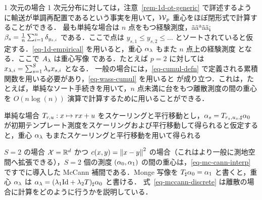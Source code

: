 \begin{rem1}{1 次元の場合}\label{rem-bary-1d}
	1 次元分布に対しては，注意~\ref{rem-1d-ot-generic} で詳述するように輸送が単調再配置であるという事実を用いて，$\operatorname{\mathcal{W}}_p$ 重心をほぼ閉形式で計算することができる．
	最も単純な場合は $n$ 点をもつ経験測度，ããªãã¡$\beta_s = \frac{1}{n}\sum_{i=1}^n \delta_{y_{s,i}}$ である．ここで点は $y_{s,1} \leq y_{s,2} \leq \ldots$ とソートされていると仮定する．\eqref{eq-1d-empirical} を用いると，重心 $\alpha_\lambda$ もまた $n$ 点上の経験測度
	となる．ここで $A_\lambda$ は重心写像
	である．たとえば $p=2$ に対しては $x_{\lambda,i} = \sum_{s=1}^S \lambda_s x_{s,i}$ となる．
	一般の場合には，\eqref{eq-cumul-defn} で定義される累積関数を用いる必要があり，\eqref{eq-wass-cumul} を用いると
	が成り立つ．これは，たとえば，単純なソート手続きを用いて，$n$ 点未満に台をもつ離散測度の間の重心を $O(n\log(n))$ 演算で計算するために用いることができる．
\end{rem1}



\begin{rem1}{単純な場合}
	$T_{r,u} : x \mapsto rx+u$ をスケーリングと平行移動とし，$\alpha_{s} = T_{r_s,u_s,\sharp} \alpha_0$ が初期テンプレート測度をスケーリングおよび平行移動して得られると仮定すると，重心 $\alpha_\lambda$ もまたスケーリングと平行移動を用いて得られる 
\end{rem1}


\begin{rem1}{$S=2$ の場合}
	$\mathcal{X}=\mathbb{R}^d$ かつ $c(x,y)=\left\| x-y \right\|^2$ の場合（これはより一般に測地空間へ拡張できる），$S=2$ 個の測度 $(\alpha_0,\alpha_1)$ の間の重心は，\eqref{eq-mc-cann-interp} ですでに導入した McCann 補間である．Monge 写像を $T_\sharp \alpha_0=\alpha_1$ と書くと，重心 $\alpha_\lambda$ は $\alpha_\lambda = (\lambda_1 \mathrm{Id} + \lambda_2 T)_{\sharp} \alpha_0$ と書ける．
	式~\eqref{eq-mccann-discrete} は離散の場合に計算をどのように行うかを説明している．
\end{rem1}



